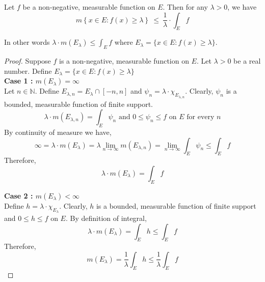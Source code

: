 \begin{theorem}
	Let $f$ be a non-negative, measurable function on $E$.
	Then for any $\lambda > 0$, we have
	\begin{equation}
		m\left\{x \in E : f(x) \ge \lambda \right\}\ \le\ \frac{1}{\lambda} \cdot \int_E f
	\end{equation}
\end{theorem}
	In other words $\displaystyle \lambda \cdot m \left( E_\lambda \right) \le \int_E f$ where $E_\lambda = \{ x \in E : f(x) \ge \lambda \}$.
\begin{proof}
	Suppose $f$ is a non-negative, measurable function on $E$.
	Let $\lambda > 0$ be a real number.
	Define $E_\lambda = \{ x \in E : f(x) \ge \lambda \}$\\

	\textbf{Case 1 : $m(E_\lambda) = \infty$}\\
	Let $n \in \mathbb{N}$.
	Define $E_{\lambda,n} = E_\lambda \cap [-n,n]$ and $\psi_n = \lambda \cdot \chi_{E_{\lambda,n}}$.
	Clearly, $\psi_n$ is a bounded, measurable function of finite support.
	$$\lambda\cdot m(E_{\lambda,n}) = \int_E \psi_n \text{ and } 0 \le \psi_n \le f \text{ on $E$ for every $n$}$$
	By continuity of measure we have,
	$$ \infty = \lambda \cdot m(E_\lambda) = \lambda \lim_{n \to \infty} m(E_{\lambda,n}) = \lim_{n \to \infty} \int_E \psi_n \le \int_E f $$
	Therefore,
	$$\lambda \cdot m(E_\lambda) = \int_E f$$

	\textbf{Case 2 : $m(E_\lambda) <\infty$}\\
	Define $h = \lambda \cdot \chi_{E_\lambda}$.
	Clearly, $h$ is a bounded, measurable function of finite support and $0 \le h \le f$ on $E$.
	By definition of integral,
	$$ \lambda \cdot m(E_\lambda) = \int_E h \le \int_E f$$
	Therefore,
	$$ m(E_\lambda) = \frac{1}{\lambda} \int_E h \le \frac{1}{\lambda} \int_E f$$
\end{proof}

